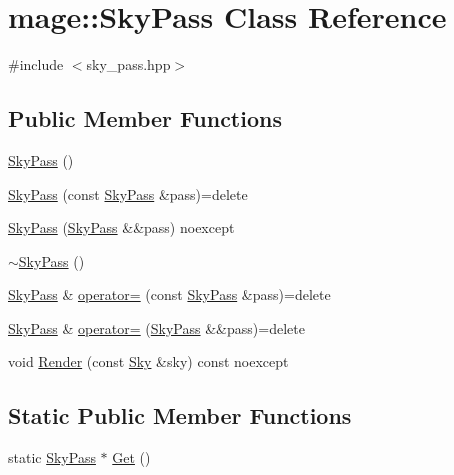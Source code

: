 \hypertarget{classmage_1_1_sky_pass}{}\section{mage\+:\+:Sky\+Pass Class Reference}
\label{classmage_1_1_sky_pass}


{\ttfamily \#include $<$sky\+\_\+pass.\+hpp$>$}

\subsection*{Public Member Functions}
\begin{DoxyCompactItemize}
\item 
\hyperlink{classmage_1_1_sky_pass_a41bb9d2d37f2c3a7bc5b12cffad9dafa}{Sky\+Pass} ()
\item 
\hyperlink{classmage_1_1_sky_pass_a592a3543ea73c98324dcc7714b8639cf}{Sky\+Pass} (const \hyperlink{classmage_1_1_sky_pass}{Sky\+Pass} \&pass)=delete
\item 
\hyperlink{classmage_1_1_sky_pass_a0ccc1b6821e8bc3fbdf7ed2659347017}{Sky\+Pass} (\hyperlink{classmage_1_1_sky_pass}{Sky\+Pass} \&\&pass) noexcept
\item 
\hyperlink{classmage_1_1_sky_pass_ab3e581e2eedfc62e13c71d91359f71ce}{$\sim$\+Sky\+Pass} ()
\item 
\hyperlink{classmage_1_1_sky_pass}{Sky\+Pass} \& \hyperlink{classmage_1_1_sky_pass_aba0111417b69724799b8cc94ac4d8af6}{operator=} (const \hyperlink{classmage_1_1_sky_pass}{Sky\+Pass} \&pass)=delete
\item 
\hyperlink{classmage_1_1_sky_pass}{Sky\+Pass} \& \hyperlink{classmage_1_1_sky_pass_ab8b0fee280f8b13f335ff33b7d153755}{operator=} (\hyperlink{classmage_1_1_sky_pass}{Sky\+Pass} \&\&pass)=delete
\item 
void \hyperlink{classmage_1_1_sky_pass_a832e22543e9de25e316dd03d96ccf34b}{Render} (const \hyperlink{classmage_1_1_sky}{Sky} \&sky) const noexcept
\end{DoxyCompactItemize}
\subsection*{Static Public Member Functions}
\begin{DoxyCompactItemize}
\item 
static \hyperlink{classmage_1_1_sky_pass}{Sky\+Pass} $\ast$ \hyperlink{classmage_1_1_sky_pass_af608935f6cb4b631512ee9c9eb6dec9d}{Get} ()
\end{DoxyCompactItemize}
